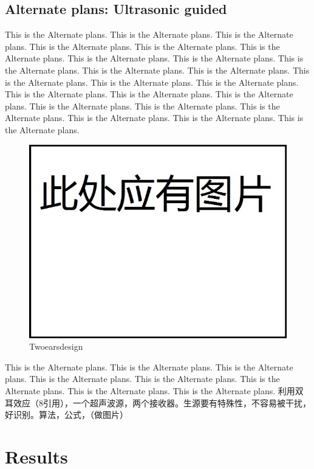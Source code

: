 \documentclass[12pt]{article}
\begin{document}
\begin{flushleft}
\subsection{Alternate plans: Ultrasonic guided}
This is the Alternate plans. This is the Alternate plans. This is the Alternate plans. This is the Alternate plans. This is the Alternate plans. This is the Alternate plans. This is the Alternate plans. This is the Alternate plans. This is the Alternate plans. This is the Alternate plans. This is the Alternate plans. This is the Alternate plans. This is the Alternate plans. This is the Alternate plans. This is the Alternate plans. This is the Alternate plans. This is the Alternate plans. This is the Alternate plans. This is the Alternate plans. This is the Alternate plans. This is the Alternate plans. This is the Alternate plans. This is the Alternate plans. 
\begin{figure}[h!]
	\begin{center}
		\includegraphics[scale = 0.6]{twoearsdesign.jpg}
		\caption{Twoearsdesign}
	\end{center}
\end{figure}
This is the Alternate plans. This is the Alternate plans. This is the Alternate plans. This is the Alternate plans.\cite{muller1983automated} This is the Alternate plans. This is the Alternate plans. This is the Alternate plans. This is the Alternate plans. 
利用双耳效应（8引用），一个超声波源，两个接收器。生源要有特殊性，不容易被干扰，好识别。算法，公式，（做图片）

\section{Results}


\end{flushleft}
\end{document}
